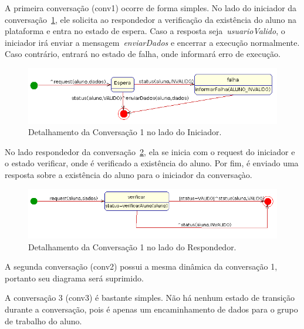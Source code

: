 A primeira conversação (conv1) ocorre de forma simples. No lado do iniciador da conversação~\ref{fig:conv1-iniciador}, ele solicita ao respondedor a verificação da existência do aluno na plataforma e entra no estado de espera. Caso a resposta seja~\emph{usuarioValido}, o iniciador irá enviar a mensagem~\emph{enviarDados} e encerrar a execução normalmente. Caso contrário, entrará no estado de falha, onde informará erro de execução.
\begin{figure}
	\centering
	\includegraphics[scale=0.48]{images/conv1-iniciador.png}
	\caption{Detalhamento da Conversação 1 no lado do Iniciador.}
	\label{fig:conv1-iniciador}
\end{figure}
No lado respondedor da conversação~\ref{fig:conv1-respondedor}, ela se inicia com o request do iniciador e o estado verificar, onde é verificado a existência do aluno. Por fim, é enviado uma resposta sobre a existência do aluno para o iniciador da conversaçào.

\begin{figure}
	\centering
	\includegraphics[scale=0.48]{images/conv1-recebedor.png}
	\caption{Detalhamento da Conversação 1 no lado do Respondedor.}
	\label{fig:conv1-respondedor}
\end{figure}

A segunda conversação (conv2) possui a mesma dinâmica da conversação 1, portanto seu diagrama será suprimido.

A conversação 3 (conv3) é bastante simples. Não há nenhum estado de transição durante a conversação, pois é apenas um encaminhamento de dados para o grupo de trabalho do aluno.

